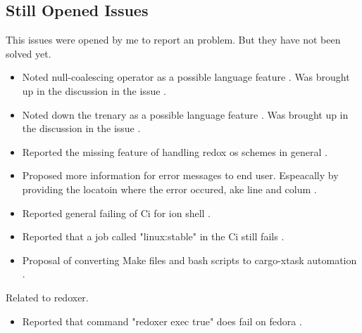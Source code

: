\subsection{Still Opened Issues}

This issues were opened by me to report an problem. But they have not been solved yet.

\begin{itemize}
	\item Noted null-coalescing operator as a possible language feature \cite{issue_null_coalescing_operator}. Was brought up in the discussion in the issue \cite{pr_subst_method}.
	\item Noted down the trenary as a possible language feature \cite{issue_ternary_operator_arrays_strings}. Was brought up in the discussion in the issue \cite{pr_subst_method}.
	\item Reported the missing feature of handling redox os schemes in general \cite{issue_disk_scheme}.
	\item Proposed more information for error messages to end user. Espeacally by providing the locatoin where the error occured, ake line and colum \cite{issue_enrich_error_message_information}.
	\item Reported general failing of Ci for ion shell \cite{issue_failing_ci}.
	\item Reported that a job called "linux:stable" in the Ci still fails \cite{issue_ci_linux_stable_fail}.
	\item Proposal of converting Make files and bash scripts to cargo-xtask automation \cite{issue_convert_make_files_to_xtask}.
\end{itemize}

Related to \gls{redoxer}.

\begin{itemize}
	\item Reported that command "redoxer exec true" does fail on fedora \cite{issue_redoxer_exec_true}.
\end{itemize}


